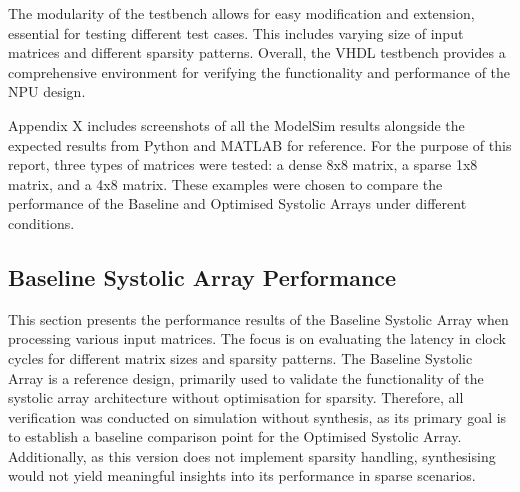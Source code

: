 \documentclass[12pt, a4paper, ukenglish]{article}
\begin{document}
    The modularity of the testbench allows for easy modification and extension, essential for testing different test cases. This includes varying size of input matrices and different sparsity patterns. Overall, the VHDL testbench provides a comprehensive environment for verifying the functionality and performance of the NPU design.

    Appendix X includes screenshots of all the ModelSim results alongside the expected results from Python and MATLAB for reference. For the purpose of this report, three types of matrices were tested: a dense 8x8 matrix, a sparse 1x8 matrix, and a 4x8 matrix. These examples were chosen to compare the performance of the Baseline and Optimised Systolic Arrays under different conditions.


    
    \subsection{Baseline Systolic Array Performance} \label{sec: perform base}

    This section presents the performance results of the Baseline Systolic Array when processing various input matrices. The focus is on evaluating the latency in clock cycles for different matrix sizes and sparsity patterns. The Baseline Systolic Array is a reference design, primarily used to validate the functionality of the systolic array architecture without optimisation for sparsity. Therefore, all verification was conducted on simulation without synthesis, as its primary goal is to establish a baseline comparison point for the Optimised Systolic Array. Additionally, as this version does not implement sparsity handling, synthesising would not yield meaningful insights into its performance in sparse scenarios.

    
\end{document}
